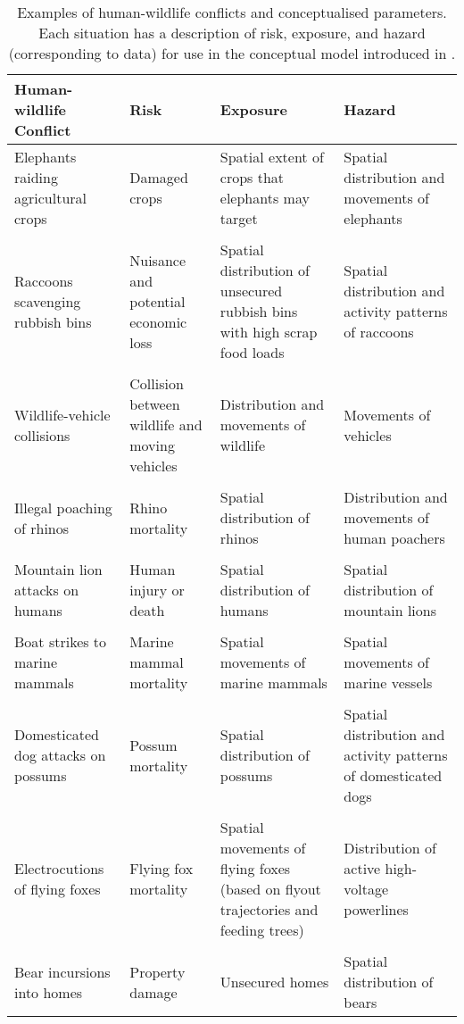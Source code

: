 \begin{table}[h]
\caption[Examples of human-wildlife conflicts and conceptualised parameters]{Examples of human-wildlife conflicts and conceptualised parameters. Each situation has a description of risk, exposure, and hazard (corresponding to data) for use in the conceptual model introduced in .}
\centering
\begin{tabularx}{0.9\textwidth}{YYYY} \toprule
Human-wildlife Conflict					&Risk			&Exposure		&Hazard \\ \midrule
Elephants raiding agricultural crops	&Damaged crops	&Spatial extent of crops that elephants may target	&Spatial distribution and movements of elephants \\
&&& \\
Raccoons scavenging rubbish bins		&Nuisance and potential economic loss	&Spatial distribution of unsecured rubbish bins with high scrap food loads	&Spatial distribution and activity patterns of raccoons \\
&&& \\
Wildlife-vehicle collisions				&Collision between wildlife and moving vehicles	&Distribution and movements of wildlife	&Movements of vehicles \\
&&& \\
Illegal poaching of rhinos				&Rhino mortality	&Spatial distribution of rhinos	&Distribution and movements of human poachers \\
&&& \\
Mountain lion attacks on humans			&Human injury or death	&Spatial distribution of humans	&Spatial distribution of mountain lions \\
&&& \\
Boat strikes to marine mammals			&Marine mammal mortality	&Spatial movements of marine mammals	&Spatial movements of marine vessels \\
&&& \\
Domesticated dog attacks on possums 	&Possum mortality	&Spatial distribution of possums	&Spatial distribution and activity patterns of domesticated dogs \\
&&& \\
Electrocutions of flying foxes			&Flying fox mortality	&Spatial movements of flying foxes (based on flyout trajectories and feeding trees)	&Distribution of active high-voltage powerlines \\
&&& \\
Bear incursions into homes				&Property damage	&Unsecured homes	&Spatial distribution of bears \\
\bottomrule
\end{tabularx}
\label{hmi_risk}
\end{table}

